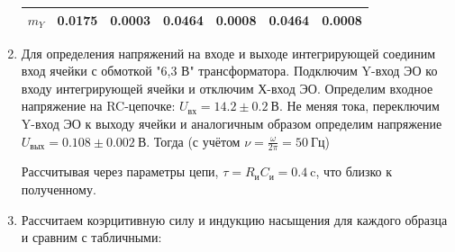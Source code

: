 \documentclass[12pt]{article}
\begin{document}
\begin{enumerate}
\begin{table}[t]
\begin{tabular}{|c|c|c||c|c||c|c|}
$m_Y$                 & 0.0175            & 0.0003         & 0.0464          & 0.0008       & 0.0464              & 0.0008           \\ \hline
\end{tabular}
\end{table}
\item Для определения напряжений на входе и выходе интегрирующей соединим вход ячейки с обмоткой "6,3 В" трансформатора. 
Подключим Y-вход ЭО ко входу интегрирующей ячейки и отключим Х-вход ЭО. Определим входное напряжение на RC-цепочке: $U_{\text{вх}} = 14.2 \pm 0.2~\text{В}$.
Не меняя тока, переключим Y-вход ЭО к выходу ячейки  и аналогичным образом определим напряжение $U_{\text{вых}}= 0.108 \pm 0.002~\text{В}$. Тогда (с учётом $\nu = \frac{\omega}{2\pi} = 50~\text{Гц}$)
\begin{center}
\end{center}
Рассчитывая через параметры цепи, $\tau = R_\text{и} C_\text{и} = 0.4~\text{c}$, что близко к полученному.

\item  Рассчитаем коэрцитивную силу и индукцию насыщения для каждого образца и сравним с табличными:
\begin{center}


\end{center}
\end{enumerate}
\end{document}

